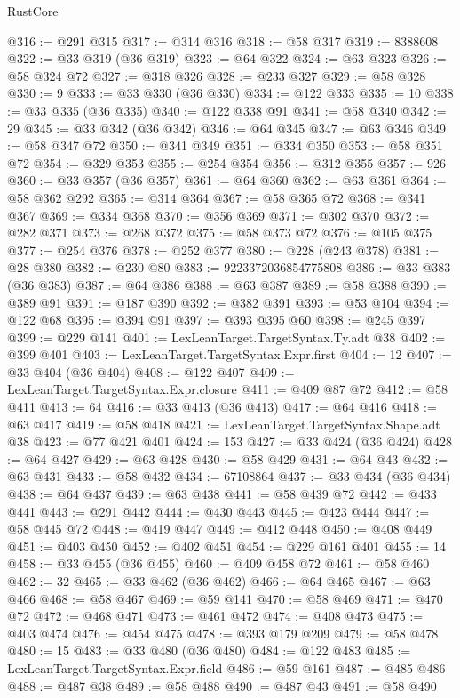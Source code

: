 \begin{lexlean}{RustCore}
\begin{coremodule}
@316 := @291 @315
@317 := @314 @316
@318 := @58 @317
@319 := 8388608
@322 := @33 @319 (@36 @319)
@323 := @64 @322
@324 := @63 @323
@326 := @58 @324 @72
@327 := @318 @326
@328 := @233 @327
@329 := @58 @328
@330 := 9
@333 := @33 @330 (@36 @330)
@334 := @122 @333
@335 := 10
@338 := @33 @335 (@36 @335)
@340 := @122 @338 @91
@341 := @58 @340
@342 := 29
@345 := @33 @342 (@36 @342)
@346 := @64 @345
@347 := @63 @346
@349 := @58 @347 @72
@350 := @341 @349
@351 := @334 @350
@353 := @58 @351 @72
@354 := @329 @353
@355 := @254 @354
@356 := @312 @355
@357 := 926
@360 := @33 @357 (@36 @357)
@361 := @64 @360
@362 := @63 @361
@364 := @58 @362 @292
@365 := @314 @364
@367 := @58 @365 @72
@368 := @341 @367
@369 := @334 @368
@370 := @356 @369
@371 := @302 @370
@372 := @282 @371
@373 := @268 @372
@375 := @58 @373 @72
@376 := @105 @375
@377 := @254 @376
@378 := @252 @377
@380 := @228 (@243 @378)
@381 := @28 @380
@382 := @230 @80
@383 := 9223372036854775808
@386 := @33 @383 (@36 @383)
@387 := @64 @386
@388 := @63 @387
@389 := @58 @388
@390 := @389 @91
@391 := @187 @390
@392 := @382 @391
@393 := @53 @104
@394 := @122 @68
@395 := @394 @91
@397 := @393 @395 @60
@398 := @245 @397
@399 := @229 @141
@401 := LexLeanTarget.TargetSyntax.Ty.adt @38
@402 := @399 @401
@403 := LexLeanTarget.TargetSyntax.Expr.first
@404 := 12
@407 := @33 @404 (@36 @404)
@408 := @122 @407
@409 := LexLeanTarget.TargetSyntax.Expr.closure
@411 := @409 @87 @72
@412 := @58 @411
@413 := 64
@416 := @33 @413 (@36 @413)
@417 := @64 @416
@418 := @63 @417
@419 := @58 @418
@421 := LexLeanTarget.TargetSyntax.Shape.adt @38
@423 := @77 @421 @401
@424 := 153
@427 := @33 @424 (@36 @424)
@428 := @64 @427
@429 := @63 @428
@430 := @58 @429
@431 := @64 @43
@432 := @63 @431
@433 := @58 @432
@434 := 67108864
@437 := @33 @434 (@36 @434)
@438 := @64 @437
@439 := @63 @438
@441 := @58 @439 @72
@442 := @433 @441
@443 := @291 @442
@444 := @430 @443
@445 := @423 @444
@447 := @58 @445 @72
@448 := @419 @447
@449 := @412 @448
@450 := @408 @449
@451 := @403 @450
@452 := @402 @451
@454 := @229 @161 @401
@455 := 14
@458 := @33 @455 (@36 @455)
@460 := @409 @458 @72
@461 := @58 @460
@462 := 32
@465 := @33 @462 (@36 @462)
@466 := @64 @465
@467 := @63 @466
@468 := @58 @467
@469 := @59 @141
@470 := @58 @469
@471 := @470 @72
@472 := @468 @471
@473 := @461 @472
@474 := @408 @473
@475 := @403 @474
@476 := @454 @475
@478 := @393 @179 @209
@479 := @58 @478
@480 := 15
@483 := @33 @480 (@36 @480)
@484 := @122 @483
@485 := LexLeanTarget.TargetSyntax.Expr.field
@486 := @59 @161
@487 := @485 @486
@488 := @487 @38
@489 := @58 @488
@490 := @487 @43
@491 := @58 @490

\end{coremodule}
\end{lexlean}
